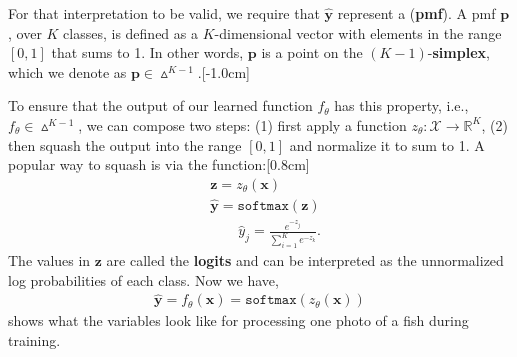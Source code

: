 For that interpretation to be valid, we require that $\hat{\mathbf{y}}$ represent a  ({\bf pmf}). A pmf $\mathbf{p}$, over $K$ classes, is defined as a $K$-dimensional vector with elements in the range $[0,1]$ that sums to 1. In other words, $\mathbf{p}$ is a point on the $(K-1)$-\textbf{simplex}, which we denote as $\mathbf{p} \in \vartriangle^{K-1}$.[-1.0cm]

To ensure that the output of our learned function $f_{\theta}$ has this property, i.e., $f_{\theta} \in \vartriangle^{K-1}$, we can compose two steps: (1) first apply a function $z_{\theta}: \mathcal{X} \rightarrow \mathbb{R}^K$, (2) then squash the output into the range $[0,1]$ and normalize it to sum to 1. 
A popular way to squash is via the  function:[0.8cm]
\begin{align}
    &\mathbf{z} = z_{\theta}(\mathbf{x})\\
    &\hat{\mathbf{y}} = \texttt{softmax}(\mathbf{z})\\
    &\quad \quad \hat{y}_j = \frac{e^{-z_j}}{\sum_{i=1}^K e^{-z_k}}.
\end{align}
The values in $\mathbf{z}$ are called the \textbf{logits} and can be interpreted as the unnormalized log probabilities of each class. 
Now we have,
\begin{align}
    \hat{\mathbf{y}} = f_{\theta}(\mathbf{x}) = \texttt{softmax}(z_{\theta}(\mathbf{x}))
\end{align}
\Fig{\ref{fig:softmax_regression_diagram}} shows what the variables look like for processing one photo of a fish during training.


